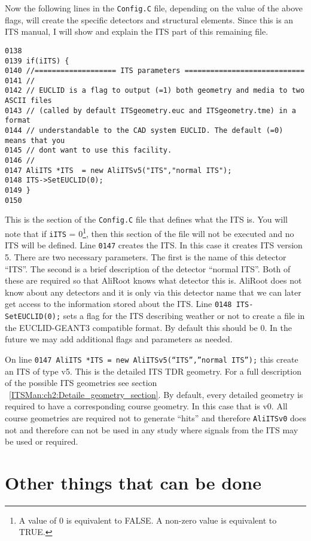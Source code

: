Now the following lines in the \texttt{Config.C} file, depending on the value
of the above flags, will create the specific detectors and structural
elements. Since this is an ITS manual, I will show and explain the ITS part of
this remaining file.

\scriptsize
\begin{verbatim}
0138
0139 if(iITS) {
0140 //=================== ITS parameters ============================
0141 //
0142 // EUCLID is a flag to output (=1) both geometry and media to two ASCII files 
0143 // (called by default ITSgeometry.euc and ITSgeometry.tme) in a format
0144 // understandable to the CAD system EUCLID. The default (=0) means that you 
0145 // dont want to use this facility.
0146 //
0147 AliITS *ITS  = new AliITSv5("ITS","normal ITS");
0148 ITS->SetEUCLID(0);
0149 }
0150 
\end{verbatim}
\normalsize

This is the section of the \texttt{Config.C} file that defines what the ITS
is. You will note that if \texttt{iITS} = 0\footnote{A value of 0 is equivalent
to FALSE. A non-zero value is equivalent to TRUE.}, then this section of the
file will not be executed and no ITS will be defined. Line \texttt{0147}
creates the ITS. In this case it creates ITS version 5. There are two necessary
parameters. The first is the name of this detector ``ITS''. The second is a
brief description of the detector ``normal ITS''. Both of these are required so
that AliRoot knows what detector this is. AliRoot does not know about any
detectors and it is only via this detector name that we can later get access to
the information stored about the ITS. Line \texttt{0148 ITS-SetEUCLID(0);} sets
a flag for the ITS describing weather or not to create a file in the
EUCLID-GEANT3 compatible format. By default this should be 0. In the future we
may add additional flags and parameters as needed.

On line \texttt{0147 AliITS *ITS = new AliITSv5(``ITS'',''normal ITS'');} this
create an ITS of type v5. This is the detailed ITS TDR geometry. For a full
description of the possible ITS geometries see section
~\ref{ITSMan:ch2:Detaile_geometry_section}. By default, every detailed geometry
is required to have a corresponding course geometry. In this case that is
v0. All course geometries are required not to generate ``hits'' and therefore
\texttt{AliITSv0} does not and therefore can not be used in any study where
signals from the ITS may be used or required.

\section*{Other things that can be done}
